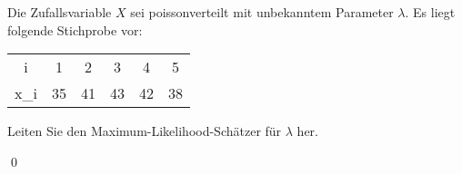 \documentclass{abgabe}
\begin{document}
\begin{questions}
    \question
    Die Zufallsvariable $X$ sei poissonverteilt mit unbekanntem Parameter $\lambda$. 
    Es liegt folgende Stichprobe vor: 
    \begin{center}
        \begin{tabular}{|C|C|C|C|C|C|}
            i   & 1  & 2  & 3  & 4  & 5  \\ 
            x_i & 35 & 41 & 43 & 42 & 38
        \end{tabular}
    \end{center}
    
    Leiten Sie den Maximum-Likelihood-Schätzer für $\lambda$ her.
    \begin{solution}

        \qed
    \end{solution}
\end{questions}
\end{document}
